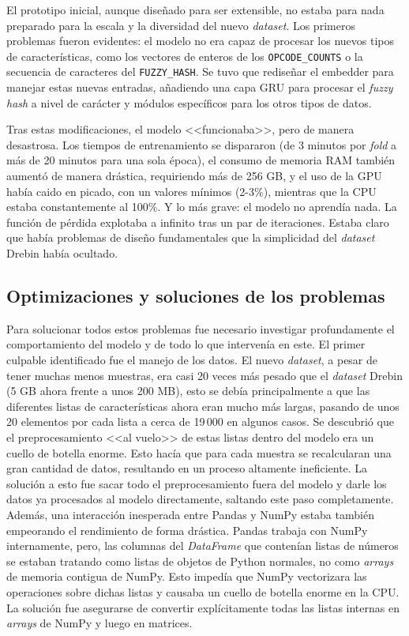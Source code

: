 El prototipo inicial, aunque diseñado para ser extensible, no estaba para nada preparado para la escala y la diversidad del nuevo \textit{dataset}. Los primeros problemas fueron evidentes: el modelo no era capaz de procesar los nuevos tipos de características, como los vectores de enteros de los \texttt{OPCODE\_COUNTS} o la secuencia de caracteres del \texttt{FUZZY\_HASH}. Se tuvo que rediseñar el embedder para manejar estas nuevas entradas, añadiendo una capa GRU para procesar el \textit{fuzzy hash} a nivel de carácter y módulos específicos para los otros tipos de datos.

Tras estas modificaciones, el modelo <<funcionaba>>, pero de manera desastrosa. Los tiempos de entrenamiento se dispararon (de 3 minutos por \textit{fold} a más de 20 minutos para una sola época), el consumo de memoria RAM también aumentó de manera drástica, requiriendo más de 256 GB, y el uso de la GPU había caido en picado, con un valores mínimos (2-3\%), mientras que la CPU estaba constantemente al 100\%. Y lo más grave: el modelo no aprendía nada. La función de pérdida explotaba a infinito tras un par de iteraciones. Estaba claro que había problemas de diseño fundamentales que la simplicidad del \textit{dataset} Drebin había ocultado.

\subsection{Optimizaciones y soluciones de los problemas}

Para solucionar todos estos problemas fue necesario investigar profundamente el comportamiento del modelo y de todo lo que intervenía en este. El primer culpable identificado fue el manejo de los datos. El nuevo \textit{dataset}, a pesar de tener muchas menos muestras, era casi 20 veces más pesado que el \textit{dataset} Drebin (5 GB ahora frente a unos 200 MB), esto se debía principalmente a que las diferentes listas de características ahora eran mucho más largas, pasando de unos 20 elementos por cada lista a cerca de 19\,000 en algunos casos. Se descubrió que el preprocesamiento <<al vuelo>> de estas listas dentro del modelo era un cuello de botella enorme. Esto hacía que para cada muestra se recalcularan una gran cantidad de datos, resultando en un proceso altamente ineficiente. La solución a esto fue sacar todo el preprocesamiento fuera del modelo y darle los datos ya procesados al modelo directamente, saltando este paso completamente. Además, una interacción inesperada entre Pandas y NumPy estaba también empeorando el rendimiento de forma drástica. Pandas trabaja con NumPy internamente, pero, las columnas del \textit{DataFrame} que contenían listas de números se estaban tratando como listas de objetos de Python normales, no como \textit{arrays} de memoria contigua de NumPy. Esto impedía que NumPy vectorizara las operaciones sobre dichas listas y causaba un cuello de botella enorme en la CPU. La solución fue asegurarse de convertir explícitamente todas las listas internas en \textit{arrays} de NumPy y luego en matrices.

